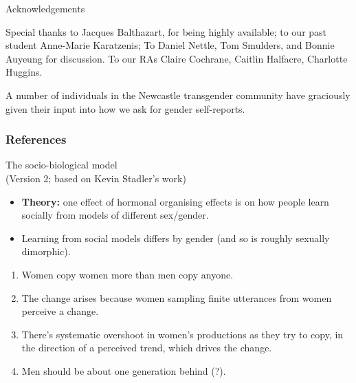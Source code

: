 \documentclass[hyperref={pdfpagelabels=false}]{beamer}
\begin{document}
\begin{frame}{Acknowledgements}
\begin{center}

Special thanks to Jacques Balthazart, for being highly available; to our past student Anne-Marie Karatzenis; To Daniel Nettle, Tom Smulders, and Bonnie Auyeung for discussion. To our RAs Claire Cochrane, Caitlin Halfacre, Charlotte Huggins.

A number of individuals in the Newcastle transgender community have graciously given their input into how we ask for gender self-reports.

\end{center}
\end{frame}



\begin{frame}[allowframebreaks]
\frametitle{References}
\newcommand*{\newblock}{natbib}


\end{frame}

\begin{frame}{The socio-biological model \\\small{(Version 2; based on Kevin Stadler's work)}}
	\begin{itemize}
	\item \textbf{Theory:} one effect of hormonal organising effects is on how people learn socially from models of different sex/gender.
	\item Learning from social models differs by gender (and so is roughly sexually dimorphic).
	\end{itemize}
	\begin{enumerate}
	\item Women copy women more than men copy anyone.
	\item The change arises because women sampling finite utterances from women perceive a change.
	\item There's systematic overshoot in women's productions as they try to copy, in the direction of a perceived trend, which drives the change.
	\item Men should be about one generation behind (?).
	\end{enumerate}

\end{frame}
\end{document}
